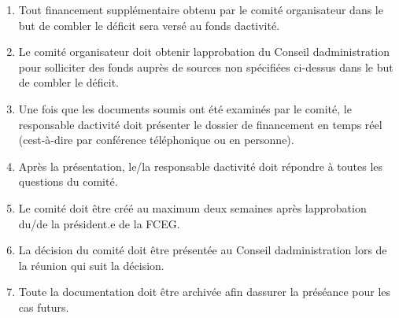 \begin{enumerate}
\begin{enumerate}
    \begin{enumerate}
     \item
      Une lettre du comité demandeur
     \item
      Le montant demandé et l\textquotesingle urgence de la demande
     \item
      Le budget proposé et le budget réel
     \item
      La trésorerie et les équivalents de trésorerie à jour
     \item
      Les raisons des écarts et des déficits
     \item
      Les plans d\textquotesingle urgence
     \item
      Les conséquences d\textquotesingle un refus de financement
     \item
      La preuve que le/la président.e du comité d\textquotesingle organisation est au courant de la situation financière
     \item
      La preuve qu\textquotesingle ils ont épuisé les fonds de leur faculté
     \item
      La preuve qu\textquotesingle il a épuisé les fonds de son association d\textquotesingle étudiants en ingénierie
     \item
      La preuve qu\textquotesingle ils ont épuisé le financement de leur société d\textquotesingle ingénierie
     \item
      D'autres informations justificatives, le cas échéant
    \end{enumerate}
  \end{enumerate}
 \item
  Tout financement supplémentaire obtenu par le comité organisateur dans le but de combler le déficit sera versé au fonds d\textquotesingle activité.
 \item
  Le comité organisateur doit obtenir l\textquotesingle approbation du Conseil d\textquotesingle administration pour solliciter des fonds auprès de sources non spécifiées ci-dessus dans le but de combler le déficit.
 \item
  Une fois que les documents soumis ont été examinés par le comité, le responsable d\textquotesingle activité doit présenter le dossier de financement en temps réel (c\textquotesingle est-à-dire par conférence téléphonique ou en personne).
 \item
  Après la présentation, le/la responsable d\textquotesingle activité doit répondre à toutes les questions du comité.
 \item
  Le comité doit être créé au maximum deux semaines après l\textquotesingle approbation du/de la président.e de la FCEG.
 \item
  La décision du comité doit être présentée au Conseil d\textquotesingle administration lors de la réunion qui suit la décision.
 \item
  Toute la documentation doit être archivée afin d\textquotesingle assurer la préséance pour les cas futurs.
\end{enumerate}

